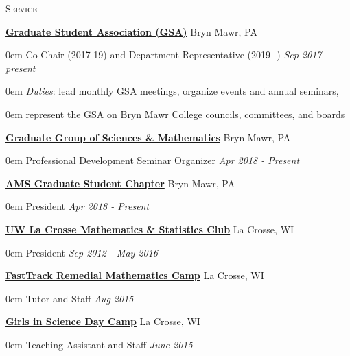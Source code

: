 \documentclass[11pt]{article}
\newenvironment{headitem}[2]{\vskip5pt \hspace{.5em} \textbf{#1} \hfill #2 \begin{addmargin}[0em]{0em}}{\end{addmargin}}
\renewenvironment{section}[1]{\textsc{\large #1}}{\vskip10pt}
\newcommand{\itemreg}[1]{\begin{addmargin}[.75em]{0em} #1 \end{addmargin}}
\newcommand{\itemdate}[2]{\hspace{.5em} #1 \hfill \textit{#2} \\}
\begin{document}
\begin{section}{Service}

	\begin{headitem}{\href{https://www.brynmawr.edu/gsas/}{Graduate Student Association (GSA)}}{Bryn Mawr, PA}
		\itemdate{Co-Chair (2017-19) and Department Representative (2019 -)}{Sep 2017 - present}
		\itemreg{\textit{Duties}: lead monthly GSA meetings, organize events and annual seminars,}
		\itemreg{\hskip5pt represent the GSA on Bryn Mawr College councils, committees, and boards}
	\end{headitem}
	
	\begin{headitem}{\href{https://www.brynmawr.edu/ggsm}{Graduate Group of Sciences \& Mathematics}}{Bryn Mawr, PA}
		\itemdate{Professional Development Seminar Organizer}{Apr 2018 - Present}
	\end{headitem}
	
	\begin{headitem}{\href{http://www.ams.org/programs/studentchapters}{AMS Graduate Student Chapter}}{Bryn Mawr, PA}
		\itemdate{President}{Apr 2018 - Present}
	\end{headitem}
	
	\begin{headitem}{\href{https://www.uwlax.edu/mathematics/activities/mathematics-and-stats-club/}{UW La Crosse Mathematics \& Statistics Club}}{La Crosse, WI}
		\itemdate{President}{Sep 2012 - May 2016}
	\end{headitem}
	
	\begin{headitem}{\href{https://www.uwlax.edu/mathematics/fasttrack/}{FastTrack Remedial Mathematics Camp}}{La Crosse, WI}
		\itemdate{Tutor and Staff}{Aug 2015}
	\end{headitem}
	
	\begin{headitem}{\href{https://www.uwlax.edu/conted/youth-programs/girls-in-science/welcome/}{Girls in Science Day Camp}}{La Crosse, WI}
		\itemdate{Teaching Assistant and Staff}{June 2015}
	\end{headitem}
	
\end{section}
\end{document}
